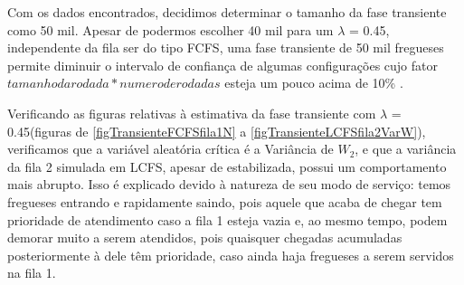 \documentclass[a4paper,10pt]{article}
\begin{document}
%

    Com os dados encontrados, decidimos determinar o tamanho da fase transiente como 50 mil. Apesar de podermos escolher 40 mil para um $\lambda$ = 0.45, independente da fila ser do tipo FCFS, uma fase transiente de 50 mil fregueses permite diminuir o intervalo de confiança de algumas configurações cujo fator $tamanho da rodada * numero de rodadas$ esteja um pouco acima de 10\% .

    Verificando as figuras relativas à estimativa da fase transiente com $\lambda$ = 0.45(figuras de \ref{figTransienteFCFSfila1N} a \ref{figTransienteLCFSfila2VarW}),
verificamos que a variável aleatória crítica é a Variância de $W_2$, e que a variância da fila 2 simulada em LCFS, apesar de estabilizada, possui um comportamento mais abrupto.
Isso é explicado devido à natureza de seu modo de serviço: temos fregueses entrando e rapidamente saindo, pois aquele que acaba de chegar tem prioridade de atendimento caso a fila 1 esteja vazia e,
ao mesmo tempo, podem demorar muito a serem atendidos, pois quaisquer chegadas acumuladas posteriormente à dele têm prioridade, caso ainda haja fregueses a serem servidos na fila 1.
\end{document}
